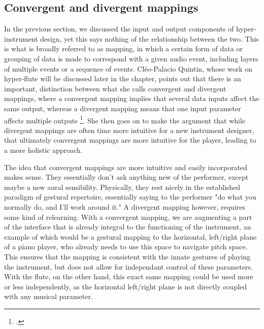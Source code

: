\documentclass[12pt,twoside,maitrise]{dms_ks}
\theoremstyle{definition}
\begin{document}
\subsection{Convergent and divergent mappings}

In the previous section, we discussed the input and output components of hyper-instrument design, yet this says nothing of the relationship between the two.
This is what is broadly referred to as mapping, in which a certain form of data or grouping of data is made to correspond with a given audio event, including layers of multiple events or a sequence of events. 
Cléo-Palacio Quintin, whose work on hyper-flute will be discussed later in the chapter, points out that there is an important, distinction between what she calls convergent and divergent mappings, where a convergent mapping implies that several data inputs affect the same output, whereas a divergent mapping means that one input parameter affects multiple outputs \footcite[44--45]{palacio-quintin_composition_2012-1}. 
She then goes on to make the argument that while divergent mappings are often time more intuitive for a new instrument designer, that ultimately convergent mappings are more intuitive for the player, leading to a more holistic approach. 


The idea that convergent mappings are more intuitive and easily incorporated makes sense. 
They essentially don't ask anything new of the performer, except maybe a new aural sensibility. 
Physically, they rest nicely in the established paradigm of gestural repertoire, essentially saying to the performer "do what you normally do, and I'll work around it." A divergent mapping however, requires some kind of relearning. 
With a convergent mapping, we are augmenting a part of the interface that is already integral to the functioning of the instrument, an example of which would be a gestural mapping to the horizontal, left/right plane of a piano player, who already needs to use this space to navigate pitch space.
This ensures that the mapping is consistent with the innate gestures of playing the instrument, but does not allow for independant control of these parameters.
With the flute, on the other hand, this exact same mapping could be used more or less independently, as the horizontal left/right plane is not directly coupled with any musical parameter.
\end{document}
